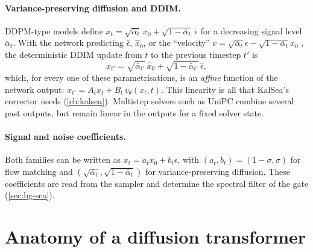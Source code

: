 \paragraph{Variance-preserving diffusion and DDIM.} DDPM-type models \citep{ho2020ddpm} define $x_t = \sqrt{\bar\alpha_t}\,x_0 + \sqrt{1-\bar\alpha_t}\,\epsilon$ for a decreasing signal level $\bar\alpha_t$. With the network predicting $\hat\epsilon$, $\hat x_0$, or the ``velocity'' $v = \sqrt{\bar\alpha_t}\epsilon - \sqrt{1-\bar\alpha_t}x_0$ \citep{salimans2022progressive}, the deterministic DDIM update \citep{song2021ddim} from $t$ to the previous timestep $t'$ is
\begin{equation}\label{eq:bg-ddim}
  x_{t'} = \sqrt{\bar\alpha_{t'}}\,\hat x_0 + \sqrt{1-\bar\alpha_{t'}}\,\hat\epsilon ,
\end{equation}
which, for every one of these parametrisations, is an \emph{affine} function of the network output: $x_{t'} = A_t x_t + B_t\, v_\theta(x_t,t)$. This linearity is all that KalSea's corrector needs (\cref{ch:kalsea}). Multistep solvers such as UniPC \citep{zhao2023unipc} combine several past outputs, but remain linear in the outputs for a fixed solver state.

\paragraph{Signal and noise coefficients.} Both families can be written as $x_t = a_t x_0 + b_t\epsilon$, with $(a_t,b_t)=(1-\sigma,\sigma)$ for flow matching and $(\sqrt{\bar\alpha_t},\sqrt{1-\bar\alpha_t})$ for variance-preserving diffusion. These coefficients are read from the sampler and determine the spectral filter of the gate (\cref{sec:bg-sea}).

\section{Anatomy of a diffusion transformer}\label{sec:bg-dit}

